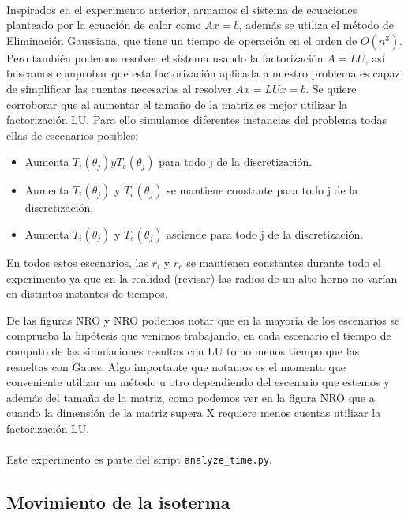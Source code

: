 \documentclass[12pt]{article}
\begin{document}
\paragraph{} Inspirados en el experimento anterior, armamos el sistema de ecuaciones planteado por la ecuación de calor como \(Ax = b\), además se utiliza el método de Eliminación Gaussiana, que tiene un tiempo de operación en el orden de $O({n^3})$. Pero también podemos resolver el sistema usando la factorización \(A = LU\), así buscamos comprobar que esta factorización aplicada a nuestro problema es capaz de simplificar las cuentas necesarias al resolver \(Ax = LUx = b\). Se quiere corroborar que al aumentar el tamaño de la matriz es mejor utilizar la factorización LU. Para ello simulamos diferentes instancias del problema todas ellas de escenarios posibles:
\begin{itemize}
	\item Aumenta $T_{i}(\theta_{j} ) y T_{e}(\theta_{j})$ para todo j de la discretización.
	\item Aumenta $T_{i}(\theta_{j} )$ y $T_{e}(\theta_{j})$ se mantiene constante para todo j de la discretización.
	\item Aumenta $T_{i}(\theta_{j} )$ y $T_{e}(\theta_{j})$ asciende para todo j de la discretización.
\end{itemize}

En todos estos escenarios, las $r_{i}$ y $r_{e}$ se mantienen constantes durante todo el experimento ya que en la realidad (revisar) las radios de un alto horno no varían en distintos instantes de tiempos. 

De las figuras NRO y NRO podemos notar que en la mayoría de los escenarios se comprueba la hipótesis que venimos trabajando, en cada escenario el tiempo de computo de las simulaciones resultas con LU tomo menos tiempo que las resueltas con Gauss. Algo importante que notamos es el momento que conveniente utilizar un método u otro dependiendo del escenario que estemos y además del tamaño de la matriz, como podemos ver en la figura NRO que a cuando la dimensión de la matriz supera X requiere menos cuentas utilizar la factorización LU.


\paragraph{} Este experimento es parte del script \texttt{analyze\_time.py}.

\subsection{Movimiento de la isoterma}
\end{document}
